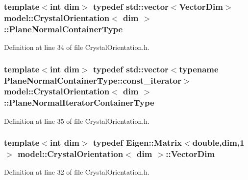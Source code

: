 \subsubsection[{Plane\+Normal\+Container\+Type}]{\setlength{\rightskip}{0pt plus 5cm}template$<$int dim$>$ typedef std\+::vector$<${\bf Vector\+Dim}$>$ {\bf model\+::\+Crystal\+Orientation}$<$ {\bf dim} $>$\+::{\bf Plane\+Normal\+Container\+Type}}\label{classmodel_1_1_crystal_orientation_a55ae599a60a13e109c1445889b42f87b}


Definition at line 34 of file Crystal\+Orientation.\+h.

\hypertarget{classmodel_1_1_crystal_orientation_a48e93a01771bebe12e6f6be1f728cd39}{}
\subsubsection[{Plane\+Normal\+Iterator\+Container\+Type}]{\setlength{\rightskip}{0pt plus 5cm}template$<$int dim$>$ typedef std\+::vector$<$typename Plane\+Normal\+Container\+Type\+::const\+\_\+iterator$>$ {\bf model\+::\+Crystal\+Orientation}$<$ {\bf dim} $>$\+::{\bf Plane\+Normal\+Iterator\+Container\+Type}}\label{classmodel_1_1_crystal_orientation_a48e93a01771bebe12e6f6be1f728cd39}


Definition at line 35 of file Crystal\+Orientation.\+h.

\hypertarget{classmodel_1_1_crystal_orientation_a32108cd454d481e0e57a0d2801d2adaa}{}
\subsubsection[{Vector\+Dim}]{\setlength{\rightskip}{0pt plus 5cm}template$<$int dim$>$ typedef Eigen\+::\+Matrix$<$double,{\bf dim},1$>$ {\bf model\+::\+Crystal\+Orientation}$<$ {\bf dim} $>$\+::{\bf Vector\+Dim}}\label{classmodel_1_1_crystal_orientation_a32108cd454d481e0e57a0d2801d2adaa}


Definition at line 32 of file Crystal\+Orientation.\+h.



